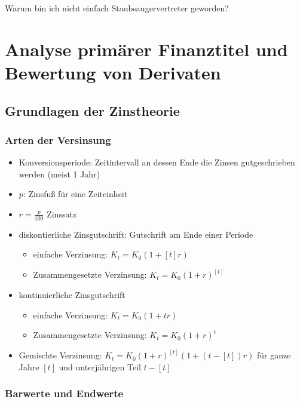 \documentclass[12pt]{report}
\theoremstyle{dotless}
\theoremstyle{definition}
\begin{document}
\begin{titlepage}
	Warum bin ich nicht einfach Staubsaugervertreter geworden?
\end{titlepage}

\tableofcontents

\chapter{Analyse prim\"arer Finanztitel und Bewertung von Derivaten}

\section{Grundlagen der Zinstheorie}

\subsection{Arten der Versinsung}

\begin{itemize}
	\item Konversionsperiode: Zeitintervall an dessen Ende die Zinsen gutgeschrieben werden (meist 1 Jahr)
	\item $p$: Zinsfu{\ss} f\"ur eine Zeiteinheit
	\item $r=\frac{p}{100}$ Zinssatz
	\item diskontierliche Zinsgutschrift: Gutschrift am Ende einer Periode
		\begin{itemize}
			\item einfache Verzinsung: $K_t = K_0(1+[t]r)$
			\item Zusammengesetzte Verzinsung: $K_t=K_0(1+r)^{[t]}$
		\end{itemize}
	\item kontinuierliche Zinsgutschrift
		\begin{itemize}
			\item einfache Verzinsung: $K_t = K_0(1+tr)$
			\item Zusammengesetzte Verzinsung: $K_t=K_0(1+r)^{t}$
		\end{itemize}
	\item Gemischte Verzinsung: $K_t=K_0(1+r)^{[t]}(1+(t-[t])r)$ f\"ur ganze Jahre $[t]$ und unterj\"ahrigen Teil $t-[t]$
\end{itemize}

\subsection{Barwerte und Endwerte}
\end{document}
